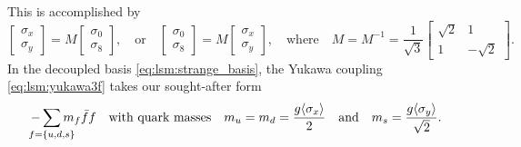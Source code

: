 This is accomplished by
\begin{equation}
	\begin{bmatrix} \sigma_x \\ \sigma_y \end{bmatrix} = M \begin{bmatrix} \sigma_0 \\ \sigma_8 \end{bmatrix},
	\quad \text{or} \quad
	\begin{bmatrix} \sigma_0 \\ \sigma_8 \end{bmatrix} = M \begin{bmatrix} \sigma_x \\ \sigma_y \end{bmatrix},
	\quad \text{where} \quad
	M = M^{-1} = \frac{1}{\sqrt{3}} \begin{bmatrix} \sqrt{2} & 1 \\ 1 & -\sqrt{2} \end{bmatrix}.
\label{eq:lsm:strange_basis}
\end{equation}
In the decoupled basis \eqref{eq:lsm:strange_basis}, the Yukawa coupling \eqref{eq:lsm:yukawa3f} takes our sought-after form
\begin{equation}
	- \smashoperator{\sum_{f=\{u,d,s\}}} m_f \bar{f} f
	\quad \text{with quark masses} \quad
	m_u = m_d = \frac{g \avg{\sigma_x}}{2}
	\quad \text{and} \quad
	m_s = \frac{g \avg{\sigma_y}}{\sqrt{2}}.
\label{eq:lsm:quark_masses_3f}
\end{equation}

